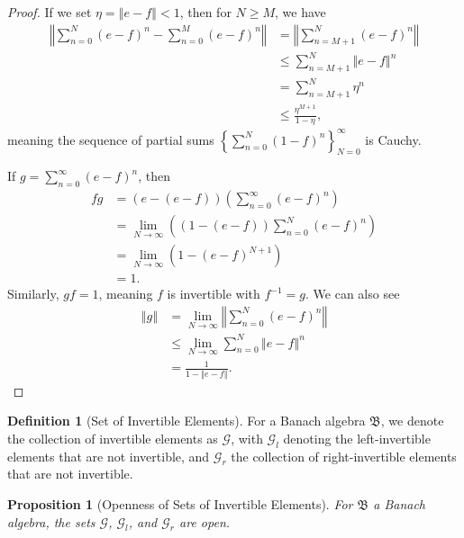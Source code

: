 \documentclass[10pt]{extarticle}
\newcommand{\norm}[1]{\left\Vert #1\right\Vert}
\newcommand{\set}[1]{\left\{#1\right\}}
\theoremstyle{plain}
\newtheorem*{proposition}{Proposition}
\theoremstyle{definition}
\newtheorem*{definition}{Definition}
\theoremstyle{note}
\renewcommand{\newline}{\hfill\break}
\begin{document}
\begin{proof}
  If we set $\eta = \norm{e-f} < 1$, then for $N\geq M$, we have
  \begin{align*}
    \norm{\sum_{n=0}^{N}\left(e-f\right)^{n} - \sum_{n=0}^{M}\left(e-f\right)^{n}} &= \norm{\sum_{n=M+1}^{N}\left(e-f\right)^{n}}\\
                                                                                   &\leq \sum_{n=M+1}^{N}\norm{e-f}^n\\
                                                                                   &= \sum_{n=M+1}^{N}\eta^{n}\\
                                                                                   &\leq \frac{\eta^{M+1}}{1-\eta},
  \end{align*}
  meaning the sequence of partial sums $\set{\sum_{n=0}^{N}(1-f)^n}_{N=0}^{\infty}$ is Cauchy.\newline

  If $g = \sum_{n=0}^{\infty}\left(e-f\right)^{n}$, then
  \begin{align*}
    fg &= \left(e-(e-f)\right)\left(\sum_{n=0}^{\infty}\left(e-f\right)^n\right)\\
       &= \lim_{N\rightarrow\infty}\left(\left(1-(e-f)\right)\sum_{n=0}^{N}\left(e-f\right)^{n}\right)\\
       &= \lim_{N\rightarrow\infty} \left(1-\left(e-f\right)^{N+1}\right)\\
       &= 1.
  \end{align*}
  Similarly, $gf = 1$, meaning $f$ is invertible with $f^{-1} = g$. We can also see
  \begin{align*}
    \norm{g} &= \lim_{N\rightarrow\infty}\norm{\sum_{n=0}^{N}\left(e-f\right)^n}\\
             &\leq \lim_{N\rightarrow\infty}\sum_{n=0}^{N}\norm{e-f}^n\\
             &= \frac{1}{1-\norm{e-f}}.
  \end{align*}
\end{proof}
\begin{definition}[Set of Invertible Elements]
  For a Banach algebra $\mathfrak{B}$, we denote the collection of invertible elements as $\mathcal{G}$, with $\mathcal{G}_{l}$ denoting the left-invertible elements that are not invertible, and $\mathcal{G}_{r}$ the collection of right-invertible elements that are not invertible.
\end{definition}
\begin{proposition}[Openness of Sets of Invertible Elements]
  For $\mathfrak{B}$ a Banach algebra, the sets $\mathcal{G}$, $\mathcal{G}_l$, and $\mathcal{G}_r$ are open.
\end{proposition}
\end{document}
